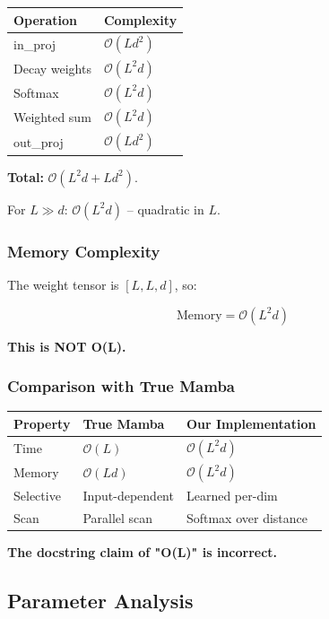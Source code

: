 \begin{table}[H]
\centering
\small
\begin{tabular}{ll}
\toprule
\textbf{Operation} & \textbf{Complexity} \\
\midrule
in\_proj & $\mathcal{O}(L d^2)$ \\
Decay weights & $\mathcal{O}(L^2 d)$ \\
Softmax & $\mathcal{O}(L^2 d)$ \\
Weighted sum & $\mathcal{O}(L^2 d)$ \\
out\_proj & $\mathcal{O}(L d^2)$ \\
\bottomrule
\end{tabular}
\end{table}

\textbf{Total:} $\mathcal{O}(L^2 d + L d^2)$.

For $L \gg d$: \textbf{$\mathcal{O}(L^2 d)$} -- quadratic in $L$.

\subsubsection{Memory Complexity}

The weight tensor is $[L, L, d]$, so:

\[
\text{Memory} = \mathcal{O}(L^2 d)
\tag{4.15}
\]

\textbf{This is NOT O(L).}

\subsubsection{Comparison with True Mamba}

\begin{table}[H]
\centering
\small
\begin{tabular}{lll}
\toprule
\textbf{Property} & \textbf{True Mamba} & \textbf{Our Implementation} \\
\midrule
Time & $\mathcal{O}(L)$ & $\mathcal{O}(L^2 d)$ \\
Memory & $\mathcal{O}(L d)$ & $\mathcal{O}(L^2 d)$ \\
Selective & Input-dependent & Learned per-dim \\
Scan & Parallel scan & Softmax over distance \\
\bottomrule
\end{tabular}
\end{table}

\textbf{The docstring claim of "O(L)" is incorrect.}

\subsection{Parameter Analysis}

